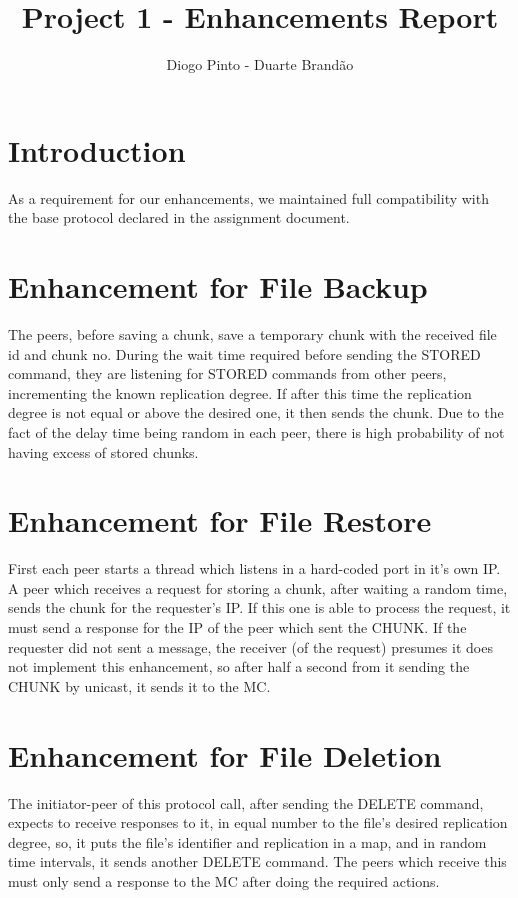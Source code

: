 \documentclass[10pt,a4paper,final]{report}
\author{Diogo Pinto - Duarte Brandão}
\title{Project 1 - Enhancements Report}
\begin{document}
\section*{Introduction}

As a requirement for our enhancements, we maintained full compatibility with the base protocol declared in the assignment document.

\section*{Enhancement for File Backup}

The peers, before saving a chunk, save a temporary chunk with the received file id and chunk no. During the wait time required before sending the STORED command, they are listening for STORED commands from other peers, incrementing the known replication degree. If after this time the replication degree is not equal or above the desired one, it then sends the chunk. Due to the fact of the delay time being random in each peer, there is high probability of not having excess of stored chunks.

\section*{Enhancement for File Restore}

First each peer starts a thread which listens in a hard-coded port in it's own IP. A peer which receives a request for storing a chunk, after waiting a random time, sends the chunk for the requester's IP. If this one is able to process the request, it must send a response for the IP of the peer which sent the CHUNK. If the requester did not sent a message, the receiver (of the request) presumes it does not implement this enhancement, so after half a second from it sending the CHUNK by unicast, it sends it to the MC.

\section*{Enhancement for File Deletion}

The initiator-peer of this protocol call, after sending the DELETE command, expects to receive responses to it, in equal number to the file's desired replication degree, so, it puts the file's identifier and replication in a map, and in random time intervals, it sends another DELETE command. The peers which receive this must only send a response to the MC after doing the required actions.
\end{document}
